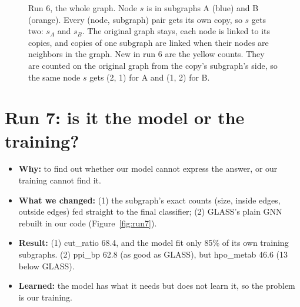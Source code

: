 \documentclass[11pt]{article}
\begin{document}
\begin{figure}[H]
\caption{Run 6, the whole graph. Node $s$ is in subgraphs A (blue) and B (orange). Every
(node, subgraph) pair gets its own copy, so $s$ gets two: $s_A$ and $s_B$. The original graph
stays, each node is linked to its copies, and copies of one subgraph are linked when their nodes
are neighbors in the graph. New in run 6 are the yellow counts. They are counted on the
original graph from the copy's subgraph's side, so the same node $s$ gets (2, 1) for A and
(1, 2) for B.}\label{fig:run6}
\end{figure}

\section*{Run 7: is it the model or the training?}
\begin{itemize}
  \item \textbf{Why:} to find out whether our model cannot express the answer, or our training cannot find it.
  \item \textbf{What we changed:} (1) the subgraph's exact counts (size, inside edges, outside edges) fed straight to the final classifier; (2) GLASS's plain GNN rebuilt in our code (Figure~\ref{fig:run7}).
  \item \textbf{Result:} (1) cut\_ratio 68.4, and the model fit only 85\% of its own training subgraphs. (2) ppi\_bp 62.8 (as good as GLASS), but hpo\_metab 46.6 (13 below GLASS).
  \item \textbf{Learned:} the model has what it needs but does not learn it, so the problem is our training.
\end{itemize}
\end{document}
